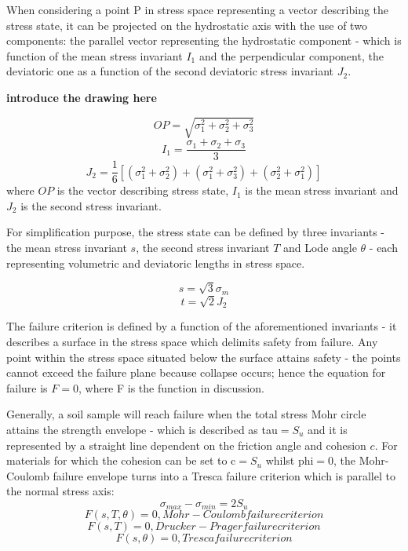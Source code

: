 \documentclass[11pt,a4paper]{report}
\begin{document}
When considering a point P in stress space representing a vector describing the stress state, it can be projected on the hydrostatic axis with the use of two components: the parallel vector representing the hydrostatic component - which is function of the mean stress invariant $I_1$ and the perpendicular component, the deviatoric one as a function of the second deviatoric stress invariant $J_2$.

\textbf{introduce the drawing here}

\begin{equation}
	OP=\sqrt{\sigma_1^2+\sigma_2^2+\sigma_3^2}
\end{equation}
\begin{equation}
	I_1=\frac{\sigma_1+\sigma_2+\sigma_3}{3} 	
\end{equation}
\begin{equation}
	 J_2=\frac{1}{6}[(\sigma_1^2+\sigma_2^2)+(\sigma_1^2+\sigma_3^2)+(\sigma_2^2+\sigma_1^2)] 
\end{equation}
where
$OP$ is  the vector describing stress state, $I_1$ is the mean stress invariant and $J_2$ is the second stress invariant.

For simplification purpose, the stress state can be defined by three invariants - the mean stress invariant $s$, the second stress invariant $T$ and Lode angle $\theta$ - each representing volumetric and deviatoric lengths in stress space.

\begin{equation}
	s=\sqrt{3}\sigma_m
\end{equation}
\begin{equation}
	t=\sqrt{2}J_2
\end{equation}

The failure criterion is defined by a function of the aforementioned invariants - it describes a surface in the stress space which delimits safety from failure. Any point within the stress space situated below the surface attains safety - the points cannot exceed the failure plane because collapse occurs; hence the equation for failure is $F = 0$, where F is the function in discussion. 

Generally, a soil sample will reach failure when the total stress Mohr circle attains the strength envelope - which is described as \gls{tau}$=S_u$ and it is represented by a straight line dependent on the friction angle and cohesion $c$. For materials for which the cohesion can be set to \gls{c}$=S_u$ whilst \gls{phi}$=0$, the Mohr-Coulomb failure envelope turns into a Tresca failure criterion which is parallel to the normal stress axis:
\begin{equation}
	\sigma_{max}-\sigma_{min}=2S_u
\end{equation}
\begin{equation}
F(s,T,\theta)=0, Mohr-Coulomb failure criterion
\end{equation}
\begin{equation}
F(s,T)=0, Drucker-Prager failure criterion
\end{equation}
\begin{equation}
F(s,\theta)=0, Tresca failure criterion
\end{equation}
\end{document}
